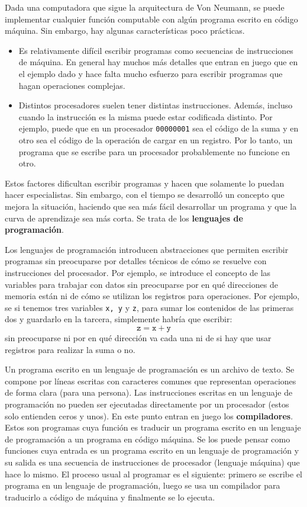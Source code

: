 \documentclass[a4paper, 12pt]{report}
\theoremstyle{definition}
\begin{document}
Dada una computadora que sigue la arquitectura de Von Neumann, se puede implementar cualquier función computable con algún programa escrito en código máquina. Sin embargo, hay algunas características poco prácticas.
\begin{itemize}
	\item Es relativamente difícil escribir programas como secuencias de instrucciones de máquina. En general hay muchos más detalles que entran en juego que en el ejemplo dado y hace falta mucho esfuerzo para escribir programas que hagan operaciones complejas.
	\item Distintos procesadores suelen tener distintas instrucciones. Además, incluso cuando la instrucción es la misma puede estar codificada distinto. Por ejemplo, puede que en un procesador {\tt 00000001} sea el código de la suma y en otro sea el código de la operación de cargar en un registro. Por lo tanto, un programa que se escribe para un procesador probablemente no funcione en otro.
\end{itemize}
Estos factores dificultan escribir programas y hacen que solamente lo puedan hacer especialistas. Sin embargo, con el tiempo se desarrolló un concepto que mejora la situación, haciendo que sea más fácil desarrollar un programa y que la curva de aprendizaje sea más corta. Se trata de los {\bf lenguajes de programación}.

Los lenguajes de programación introducen abstracciones que permiten escribir programas sin preocuparse por detalles técnicos de cómo se resuelve con instrucciones del procesador. Por ejemplo, se introduce el concepto de las variables para trabajar con datos sin preocuparse por en qué direcciones de memoria están ni de cómo se utilizan los registros para operaciones. Por ejemplo, se si tenemos tres variables {\tt x, y} y {\tt z}, para sumar los contenidos de las primeras dos y guardarlo en la tarcera, simplemente habría que escribir:
$$\mathtt{z} = \mathtt{x}+\mathtt{y}
$$
sin preocuparse ni por en qué dirección va cada una ni de si hay que usar registros para realizar la suma o no.

Un programa escrito en un lenguaje de programación es un archivo de texto. Se compone por líneas escritas con caracteres comunes que representan operaciones de forma clara (para una persona). Las instrucciones escritas en un lenguaje de programación no pueden ser ejecutadas directamente por un procesador (estos solo entienden ceros y unos). En este punto entran en juego los {\bf compiladores}. Estos son programas cuya función es traducir un programa escrito en un lenguaje de programación a un programa en código máquina. Se los puede pensar como funciones cuya entrada es un programa escrito en un lenguaje de programación y su salida es una secuencia de instrucciones de procesador (lenguaje máquina) que hace lo mismo. El proceso usual al programar es el siguiente: primero se escribe el programa en un lenguaje de programación, luego se usa un compilador para traducirlo a código de máquina y finalmente se lo ejecuta.
\end{document}
